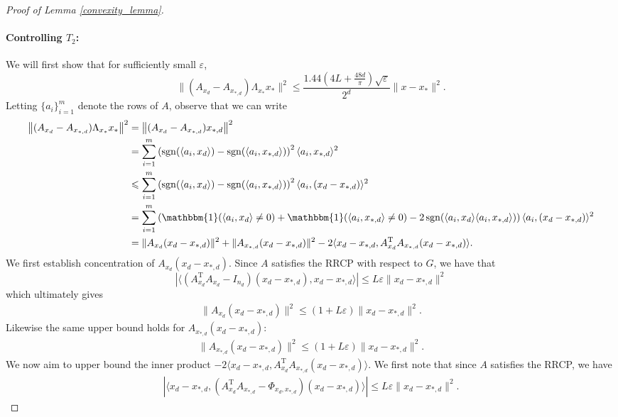 \documentclass[11pt]{article}
\renewcommand{\epsilon}{\varepsilon}
\newcommand{\one}{\operatorname{\mathbbm{1}}}
\newcommand{\sgn}{\operatorname{sgn}}
\newcommand{\G}{G}
\renewcommand{\top}{{\mathrm{T}}}
\theoremstyle{remark}
\begin{document}
\begin{proof}[Proof of Lemma \ref{convexity_lemma}]
\paragraph{Controlling $T_2$:} We will first show that for sufficiently small $\epsilon$,  $$\|(A_{x_d} - A_{x_{*,d}})\Lambda_{x_*}x_*\|^2 \leqslant \frac{1.44(4L + \frac{48d}{\pi})\sqrt{\epsilon}}{2^d}\|x - x_*\|^2.$$ Letting $\{a_i\}_{i=1}^m$ denote the rows of $A$, observe that we can write \begin{align*}
    \left\|(A_{x_d} - A_{x_{*,d}})\Lambda_{x_*}x_*\right\|^2 & = \left\|(A_{x_d} - A_{x_{*,d}})x_{*,d}\right\|^2 \\
    & = \sum_{i=1}^m\left(\sgn(\langle a_i, x_d\rangle) - \sgn(\langle a_i , x_{*,d}\rangle )\right)^2\langle a_i, x_{*,d}\rangle^2 \\
    & \leqslant \sum_{i=1}^m\left(\sgn(\langle a_i, x_d\rangle) - \sgn(\langle a_i , x_{*,d}\rangle)\right)^2\langle a_i, (x_d -x_{*,d})\rangle^2 \\
    & = \sum_{i=1}^m\left(\one(\langle a_i, x_d\rangle \neq 0) + \one(\langle a_i , x_{*,d}\rangle \neq 0) - 2\sgn(\langle a_i, x_d\rangle\langle a_i , x_{*,d}\rangle)\right)\langle a_i, (x_d -x_{*,d})\rangle^2 \\
    & = \|A_{x_d}(x_d - x_{*,d})\|^2 + \|A_{x_{*,d}}(x_d - x_{*,d})\|^2 - 2\langle x_d - x_{*,d},A_{x_d}^\top A_{x_{*,d}}(x_d - x_{*,d})\rangle. 
\end{align*} We first establish concentration of $A_{x_d}(x_d - x_{*,d})$. Since $A$ satisfies the RRCP with respect to $\G$, we have that $$|\langle (A_{x_d}^\top A_{x_d} - I_{n_d})(x_d - x_{*,d}), x_d - x_{*,d}\rangle| \leqslant L\epsilon \|x_d - x_{*,d}\|^2$$ which ultimately gives \begin{align}
    \|A_{x_d}(x_d - x_{*,d})\|^2 \leqslant (1 + L\epsilon)\|x_d - x_{*,d}\|^2. \label{A_xd_bound_w_xdx0d}
\end{align} Likewise the same upper bound holds for $A_{x_{*,d}}(x_d - x_{*,d})$: \begin{align}
    \|A_{x_{*,d}}(x_d - x_{*,d})\|^2 \leqslant (1 + L\epsilon)\|x_d - x_{*,d}\|^2. \label{A_xdstar_bound_w_xdx0d}
\end{align} We now aim to upper bound the inner product $-2\langle x_d - x_{*,d},A_{x_d}^\top A_{x_{*,d}}(x_d - x_{*,d})\rangle$. We first note that since $A$ satisfies the RRCP, we have \begin{align*}
     |\langle x_d - x_{*,d},(A_{x_d}^\top A_{x_{*,d}} - \Phi_{x_d,x_{*,d}})(x_d - x_{*,d})\rangle| \leqslant L\epsilon \|x_d - x_{*,d}\|^2. 

\end{align*}
\end{proof}
\end{document}

